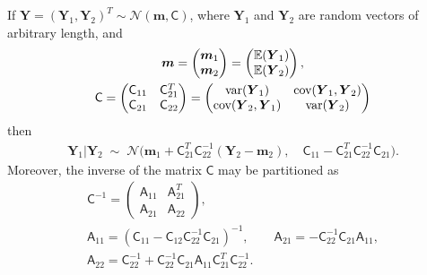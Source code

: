 \documentclass{svjour3}                     %
\newcommand{\bm}[1]{\boldsymbol{#1}}
\newcommand{\Ex}{\mathbb{E}}
\newcommand{\vm}{\bm{m}}
\newcommand{\vY}{\bm{Y}}
\newcommand{\mA}{\mathsf{A}}
\newcommand{\mC}{\mathsf{C}}
\newcommand{\cov}{{\textup{cov}}}
\newcommand{\var}{{\textup{var}}}
\newcommand{\calN}{\mathcal{N}}
\begin{document}
\begin{lemma} \cite[(A.6), (A.11--13)]{RasWil06a} \label{thrm:condDist} If $\vY = (\vY_1, \vY_2)^T \sim \calN (\vm,\mC)$, where $\vY_1$ and $\vY_2$ are random vectors of arbitrary length, and 
	\begin{gather*}
	\vm = \begin{pmatrix} \vm_1 \\ \vm_2 \end{pmatrix} = \begin{pmatrix} \Ex(\vY_1) \\ \Ex(\vY_2) \end{pmatrix}, \\
	\mC = \begin{pmatrix}
	\mC_{11} & \mC_{21}^T \\ 	\mC_{21} & \mC_{22}
	\end{pmatrix} =
	\begin{pmatrix}
	\var(\vY_{1}) & \cov(\vY_{1}, \vY_2) \\ 	\cov(\vY_2,\vY_{1}) & \var(\vY_{2})
	\end{pmatrix} 
	\end{gather*}
	then 
	\begin{align*}
	\vY_1 \vert \vY_2 \; \sim \; \calN \bigl(\vm_1 + \mC_{21}^T \mC_{22}^{-1}(\vY_2 - \vm_2), \quad \mC_{11} - \mC_{21}^T \mC_{22}^{-1} \mC_{21} \bigr).
	\end{align*}
	Moreover, the inverse of the matrix $\mC$ may be partitioned as
	\begin{gather*}
	\mC^{-1} = \begin{pmatrix} \mA_{11} & \mA_{21}^T \\ \mA_{21} & \mA_{22} \end{pmatrix}, \\
	\mA_{11} = (\mC_{11} - \mC_{12} \mC_{22}^{-1} \mC_{21})^{-1}, \qquad 
	\mA_{21} = -  \mC_{22}^{-1} \mC_{21} \mA_{11}, \\ 
	\mA_{22} = \mC_{22}^{-1} + \mC_{22}^{-1} \mC_{21} \mA_{11} \mC_{21}^T \mC_{22}^{-1}.
	\end{gather*}
\end{lemma}
\fi
\end{document}
